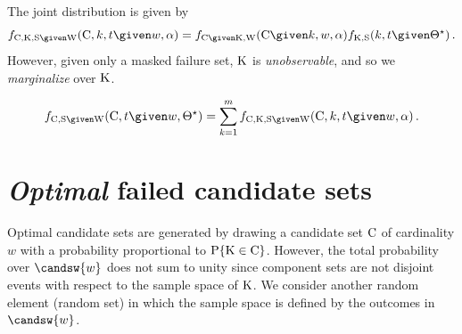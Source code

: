 \documentclass[../main.tex]{subfiles}
\begin{document}
The joint distribution is given by
\begin{equation}
	\pdf_{\rvcand,\RV{K},\sv \given \RV{W}}(\cand,k,t \given w, \alpha) = \pdf_{\rvcand \given \RV{K}, \RV{W}}(\cand \given k, w, \alpha) \pdf_{\RV{K},\sv}(k,t \given \tparam\sysparam) \,.
\end{equation}
However, given only a masked failure set, $\mathrm{K}$ is \emph{unobservable}, and so we \emph{marginalize} over $\mathrm{K}$.
\begin{theorem}
\begin{equation}
\pdf_{\rvcand,\sv \given \RV{W}}(\cand,t \given w, \tparam\sysparam) = \sum_{k=1}^{m} \pdf_{\rvcand,\RV{K},\sv \given \RV{W}}(\cand,k,t \given w, \alpha)\,.
\end{equation}
\end{theorem}

\section{\emph{Optimal} failed candidate sets}
\label{sec:opt}
Optimal candidate sets are generated by drawing a candidate set $\mathrm{C}$ of cardinality $w$ with a probability proportional to $\mathrm{P}\{\mathrm{K} \in \mathrm{C}\}$.
However, the total probability over $\candsw{w}$ does not sum to unity since component sets are not disjoint events with respect to the sample space of $\mathrm{K}$.
We consider another random element (random set) in which the sample space is defined by the outcomes in $\candsw{w}$.
\end{document}
